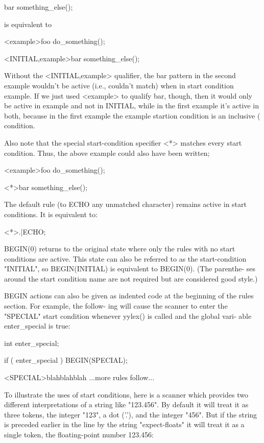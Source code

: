 \documentclass[12pt,spanish,twocolumn,lettersize]{article}
\begin{document}
	   bar		  something_else();

       is equivalent to


	   <example>foo	  do_something();

	   <INITIAL,example>bar	   something_else();

       Without the <INITIAL,example> qualifier, the  bar  pattern
       in  the	second example wouldn't be active (i.e., couldn't
       match) when in start condition example.	If we  just  used
       <example>  to  qualify  bar, though, then it would only be
       active in example and not in INITIAL, while in  the  first
       example	it's active in both, because in the first example
       the example startion condition is an inclusive (%
       condition.

       Also  note  that the special start-condition specifier <*>
       matches every start condition.  Thus,  the  above  example
       could also have been written;


	   <example>foo	  do_something();

	   <*>bar    something_else();

       The default rule (to ECHO any unmatched character) remains
       active in start conditions.  It is equivalent to:

	   <*>.|\n     ECHO;

       BEGIN(0) returns to the	original  state	 where	only  the
       rules with no start conditions are active.  This state can
       also be referred to as the start-condition  "INITIAL",  so
       BEGIN(INITIAL)  is equivalent to BEGIN(0).  (The parenthe-
       ses around the start condition name are not  required  but
       are considered good style.)

       BEGIN  actions  can  also be given as indented code at the
       beginning of the rules section.	For example, the  follow-
       ing  will  cause	 the scanner to enter the "SPECIAL" start
       condition whenever yylex() is called and the global  vari-
       able enter_special is true:

		   int enter_special;

		   if ( enter_special )
		       BEGIN(SPECIAL);

	   <SPECIAL>blahblahblah
	   ...more rules follow...

       To  illustrate  the  uses  of  start conditions, here is a
       scanner which provides two different interpretations of	a
       string  like  "123.456".	  By  default it will treat it as
       three tokens, the integer "123",	 a  dot	 ('.'),	 and  the
       integer	"456".	 But if the string is preceded earlier in
       the line by the string "expect-floats" it will treat it as
       a single token, the floating-point number 123.456:
\end{document}
